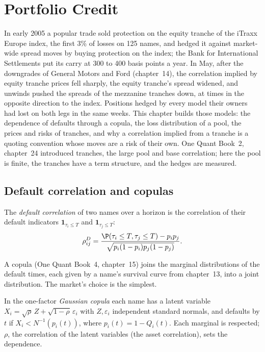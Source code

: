 \chapter{Portfolio Credit}\label{ch:rc:portfolio-credit}

In early 2005 a popular trade sold protection on the equity tranche of the iTraxx
Europe index, the first 3\% of losses on 125 names, and hedged it against market-wide
spread moves by buying protection on the index; the Bank for International Settlements
put its carry at 300 to 400 basis points a year. In May, after the downgrades of General
Motors and Ford (chapter~14), the correlation implied by equity tranche prices fell
sharply, the equity tranche's spread widened, and unwinds pushed the spreads of the
mezzanine tranches down, at times in the opposite direction to the index. Positions
hedged by every model their owners had lost on both legs in the same weeks. This
chapter builds those models: the dependence of defaults through a copula, the loss
distribution of a pool, the prices and risks of tranches, and why a correlation implied
from a tranche is a quoting convention whose moves are a risk of their own. One Quant
Book~2, chapter~24 introduced tranches, the large pool and base correlation; here the
pool is finite, the tranches have a term structure, and the hedges are measured.

\section{Default correlation and copulas}

\begin{definition}\label{def:rc:portfolio-credit:dc}
The \emph{default correlation} of two names over a horizon is
the correlation of their default indicators $\mathbf 1_{\tau_i\le T}$ and
$\mathbf 1_{\tau_j\le T}$:
\[
\rho^{D}_{ij} = \frac{\P(\tau_i\le T,\tau_j\le T)-p_ip_j}{\sqrt{p_i(1-p_i)p_j(1-p_j)}}.
\]
\end{definition}

A copula (One Quant Book~4, chapter~15) joins the marginal distributions of the default
times, each given by a name's survival curve from chapter~13, into a joint
distribution. The market's choice is the simplest.

\begin{definition}\label{def:rc:portfolio-credit:gauss}
In the one-factor \emph{Gaussian copula} each name has a latent
variable $X_i = \sqrt\rho\,Z+\sqrt{1-\rho}\,\varepsilon_i$ with $Z,\varepsilon_i$ independent
standard normals, and defaults by $t$ if $X_i < N^{-1}(p_i(t))$, where $p_i(t) = 1-Q_i(t)$.
Each marginal is respected; $\rho$, the correlation of the latent variables (the asset
correlation), sets the dependence.
\end{definition}

